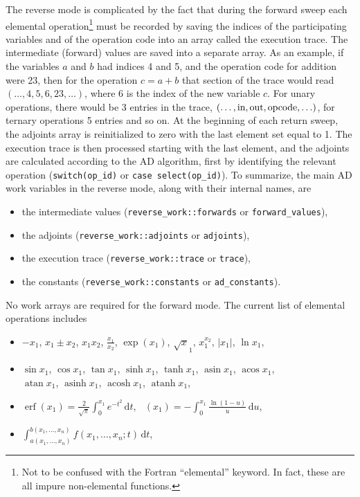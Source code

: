 \documentclass{article}
\newcommand{\D}{\,\textrm{d}}
\DeclareMathOperator{\asin}{asin}
\DeclareMathOperator{\acos}{acos}
\DeclareMathOperator{\atan}{atan}
\DeclareMathOperator{\asinh}{asinh}
\DeclareMathOperator{\acosh}{acosh}
\DeclareMathOperator{\atanh}{atanh}
\DeclareMathOperator{\erf}{erf}
\DeclareMathOperator{\Litwo}{Li_2}
\begin{document}
The reverse mode is complicated by the fact that during the forward sweep each elemental operation\footnote{Not to be confused with the Fortran ``elemental'' keyword. In fact, these are all impure non-elemental functions.} must be recorded by saving the indices of the participating variables and of the operation code into an array called the execution trace. The intermediate (forward) values are saved into a separate array. As an example, if the variables $a$ and $b$ had indices 4 and 5, and the operation code for addition were 23, then for the operation $c = a + b$ that section of the trace would read $(\ldots, 4, 5, 6, 23, \ldots)$, where 6 is the index of the new variable $c$. For unary operations, there would be 3 entries in the trace, $(\ldots, \textmd{in}, \textmd{out}, \textmd{opcode}, \ldots)$, for ternary operations 5 entries and so on. At the beginning of each return sweep, the adjoints array is reinitialized to zero with the last element set equal to 1. The execution trace is then processed starting with the last element, and the adjoints are calculated according to the AD algorithm, first by identifying the relevant operation (\texttt{switch(op\_id)} or \texttt{case select(op\_id)}). To summarize, the main AD work variables in the reverse mode, along with their internal names, are
\begin{itemize}
\item the intermediate values (\verb+reverse_work::forwards+ or \verb+forward_values+),
\item the adjoints (\verb+reverse_work::adjoints+ or \verb+adjoints+),
\item the execution trace (\verb+reverse_work::trace+ or \verb+trace+),
\item the constants (\verb+reverse_work::constants+ or \verb+ad_constants+).
\end{itemize}
No work arrays are required for the forward mode. The current list of elemental operations includes
\begin{itemize}
\item $-x_1$, \quad $x_1\pm x_2$, \quad $x_1x_2$, \quad
  $\frac{x_1}{x_2}$, \quad $\exp(x_1)$, \quad $\sqrt x_1$, \quad $x_1^{x_2}$, \quad $|x_1|$, \quad
  $\ln x_1$,
\item $\sin x_1$, \quad $\cos x_1$, \quad $\tan x_1$, \quad
  $\sinh x_1$, \quad $\tanh x_1$, \quad $\asin x_1$, \quad
  $\acos x_1$, \\ $\atan x_1$, \quad $\asinh x_1$, \quad $\acosh x_1$,
  \quad $\atanh x_1$,
\item $\erf(x_1) = \frac{2}{\sqrt{\pi}} \int_0^{x_1} e^{-t^2} \D t$,
  \quad $\Litwo(x_1) = -\int_0^{x_1} \frac{\ln(1-u)}{u} \D u$,
\item
  $\int_{a(x_1, \ldots, x_n)}^{b(x_1, \ldots, x_n)} f(x_1, \ldots,
  x_n; t) \D t$,
\end{itemize}
\end{document}
